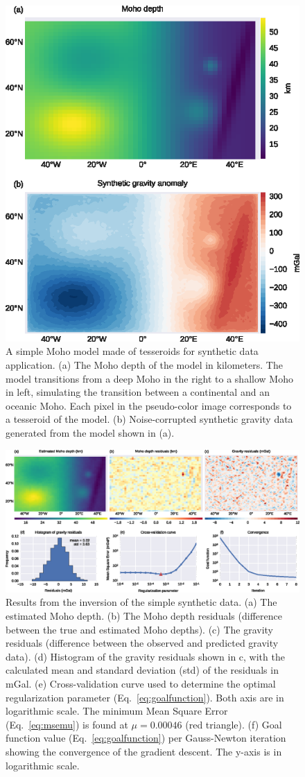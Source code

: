 \documentclass[extra,mreferee]{gji}
\begin{document}
\begin{figure}
    \centering
    \includegraphics[width=0.5\columnwidth]{figures/synthetic-simple-data}
    \caption{
        A simple Moho model made of tesseroids for synthetic data application.
        (a) The Moho depth of the model in kilometers.
        The model transitions from a deep Moho in the right to a shallow Moho in
        left, simulating the transition between a continental and an oceanic
        Moho.
        Each pixel in the pseudo-color image corresponds to a tesseroid of the
        model.
        (b) Noise-corrupted synthetic gravity data generated from the model
        shown in (a).
    }
    \label{fig:simple-data}
\end{figure}

\begin{figure}
    \centering
    \includegraphics[width=\textwidth]{figures/synthetic-simple-results}
    \caption{
        Results from the inversion of the simple synthetic data.
        (a) The estimated Moho depth.
        (b) The Moho depth residuals (difference between the true and estimated
        Moho depths).
        (c) The gravity residuals (difference between the observed and
        predicted gravity data).
        (d) Histogram of the gravity residuals shown in c, with the calculated
        mean and standard deviation (std) of the residuals in mGal.
        (e) Cross-validation curve used to determine the optimal regularization
        parameter (Eq.~\ref{eq:goalfunction}).
        Both axis are in logarithmic scale.
        The minimum Mean Square Error (Eq.~\ref{eq:msemu}) is found at
        $\mu = 0.00046$ (red triangle).
        (f) Goal function value (Eq.~\ref{eq:goalfunction}) per Gauss-Newton
        iteration showing the convergence of the gradient descent.
        The y-axis is in logarithmic scale.
    }
    \label{fig:simple-results}
\end{figure}
\end{document}
